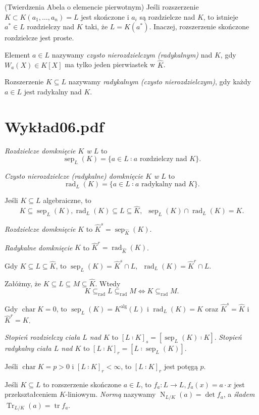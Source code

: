 \documentclass[a4paper, 12pt]{article}
\DeclareMathOperator{\Char}{char}
\DeclareMathOperator{\alg}{alg}
\DeclareMathOperator{\sep}{sep}
\DeclareMathOperator{\rad}{rad}
\DeclareMathOperator{\Tr}{Tr}
\DeclareMathOperator{\Norm}{N}
\DeclareMathOperator{\tr}{tr}
\newcommand{\+}{\enspace}
\begin{document}
(Twierdzenia Abela o elemencie pierwotnym)
Jeśli rozszerzenie $K⊂K(a_1,…,a_n)=L$ jest skończone i $a_i$ są
rozdzielcze nad $K$, to istnieje $a^*∈L$ rozdzielczy nad $K$ taki,
że $L=K(a^*)$.
Inaczej, rozszerzenie skończone rozdzielcze jest proste.

Element $a∈L$ nazywamy \textit{czysto nierozdzielczym (radykalnym)} nad $K$,
gdy $W_a(X)∈K[X]$ ma tylko jeden pierwiastek w $\hat{K}$.

Rozszerzenie $K⊆L$ nazywamy \textit{radykalnym (czysto nierozdzielczym)},
gdy każdy $a∈L$ jest radykalny nad $K$.

\section*{Wykład06.pdf}
\textit{Rozdzielcze domknięcie $K$ w $L$} to
$$\sep_L(K) = \{a∈L ∶ a \text{ rozdzielczy nad }K \}.$$

\textit{Czysto nierozdzielcze (radykalne) domknięcie $K$ w $L$} to
$$\rad_L(K) = \{a∈L ∶ a \text{ radykalny nad }K \}.$$

Jeśli $K ⊆ L$ algebraiczne, to
$$K ⊆ \sep_L(K), \rad_L(K) ⊆ L ⊆ \hat{K},
\+ \sep_L(K) ∩ \rad_L(K) = K.$$

\textit{Rozdzielcze domknięcie} $K$ to $\hat{K}^s = \sep_{\hat{K}}(K)$.

\textit{Radykalne domknięcie} $K$ to $\hat{K}^r = \rad_{\hat{K}}(K)$.

Gdy $K ⊆ L ⊆ \hat{K}$,
to $\sep_L(K) = \hat{K}^s ∩ L, \+ \rad_L(K) = \hat{K}^r ∩ L$.

Załóżmy, że $K ⊆ L ⊆ M ⊆ \hat{K}$. Wtedy
$$K ⊆_{\rad} L ⊆_{\rad} M ⇔ K ⊆_{\rad} M.$$

Gdy $\Char K = 0$,
to $\sep_L(K) = K^{\alg}(L)$ i $\rad_L(K) = K$
oraz $\hat{K}^s = \hat{K}$ i $\hat{K}^r = K$.


\textit{Stopień rozdzielczy ciała $L$ nad $K$} to $[L∶K]_s = [\sep_L(K)∶K]$.
\textit{Stopień radykalny ciała $L$ nad $K$} to $[L∶K]_r = [L∶\sep_L(K)]$.


Jeśli $\Char K = p > 0$ i $[L∶K]_r<∞$, to $[L∶K]_r$ jest potęgą $p$.


Jeśli $K ⊆ L$ to rozszerzenie skończone $a ∈ L$, to
$f_a: L → L, f_a(x) = a·x$ jest przekształceniem $K$-liniowym.
\textit{Normą} nazywamy $\Norm_{L/K}(a) = \det f_a$,
a \textit{śladem} $\Tr_{L/K}(a) = \tr f_a$.
\end{document}
